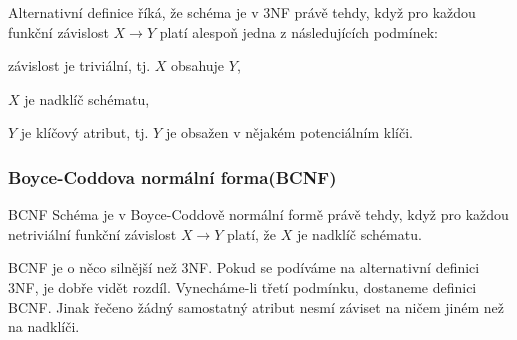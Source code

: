 Alternativní definice říká, že schéma je v 3NF právě tehdy, když pro každou
funkční závislost $X \rightarrow Y$ platí alespoň jedna z následujících podmínek:
\begin{pitemize}
\item závislost je triviální, tj. $X$ obsahuje $Y$, 
\item $X$ je nadklíč schématu,
\item $Y$ je klíčový atribut, tj. $Y$ je obsažen v nějakém potenciálním klíči.
\end{pitemize}

\subsubsection*{Boyce-Coddova normální forma(BCNF)}

\begin{definiceN}{BCNF}
Schéma je v Boyce-Coddově normální formě právě tehdy, když pro každou
netriviální funkční závislost $X \rightarrow Y$ platí, že $X$ je nadklíč
schématu.
\end{definiceN}

BCNF je o něco silnější než 3NF. Pokud se podíváme na alternativní definici 3NF, je
dobře vidět rozdíl. Vynecháme-li třetí podmínku, dostaneme definici BCNF. Jinak
řečeno žádný samostatný atribut nesmí záviset na ničem jiném než na nadklíči.

